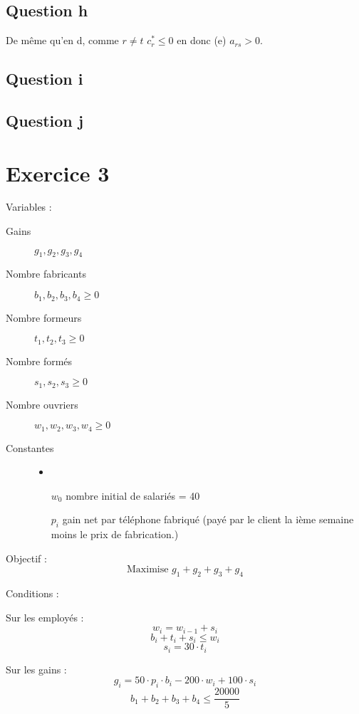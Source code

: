 \documentclass{article}
\begin{document}
\subsection*{Question h} 

De même qu'en d, comme $r\neq t$ $c_r^* \leq 0$ en donc (e) $a_{rs}>0$.

\subsection*{Question i} 

\subsection*{Question j} 




\section*{Exercice 3}

Variables :
\begin{description}
\item[Gains] $g_1,g_2,g_3,g_4$
\item[Nombre fabricants] $b_1,b_2,b_3,b_4\geq 0$
\item[Nombre formeurs] $t_1,t_2,t_3\geq 0$
\item[Nombre formés] $s_1,s_2,s_3\geq 0$
\item[Nombre ouvriers] $w_1,w_2,w_3,w_4\geq 0$
\item[Constantes]
\begin{itemize}
\item
\item[$w_0$] nombre initial de salariés = 40
\item[$p_i$] gain net par téléphone fabriqué (payé par le client la ième semaine moins le prix de fabrication.)
\end{itemize}
\end{description}


Objectif : $$\text{Maximise }g_1+g_2+g_3+g_4$$

Conditions : 

Sur les employés :
$$w_i =  w_{i-1}+s_i$$
$$b_i+t_i+s_i\leq w_i$$
$$s_i=30\cdot t_i$$

Sur les gains :
$$g_i = 50\cdot p_i \cdot b_i-200\cdot w_i+100\cdot s_i$$
$$b_1+b_2+b_3+b_4\leq \frac{20000}{5}$$
\end{document}
